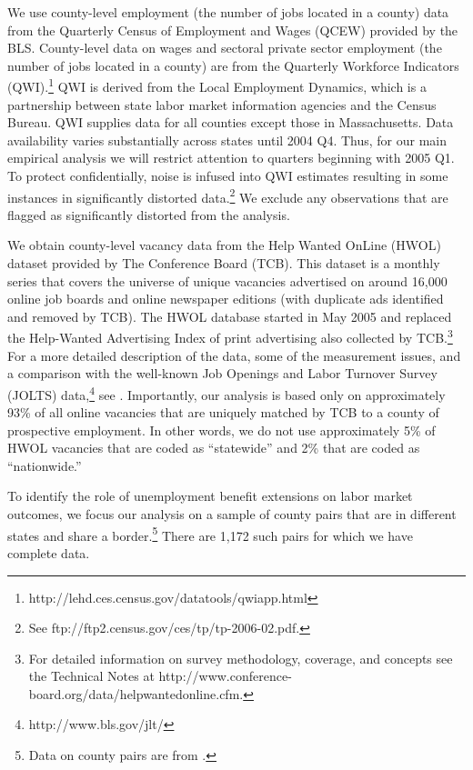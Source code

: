\documentclass[12pt]{article}
\newcommand{\1}{\mathbf{1}}
\begin{document}
We use county-level employment (the number of jobs located in a county) data from the Quarterly Census of Employment and Wages (QCEW) provided by the BLS.
County-level data on wages and sectoral private sector employment (the number of jobs located in a county) are from the Quarterly Workforce Indicators (QWI).\footnote{http://lehd.ces.census.gov/datatools/qwiapp.html} QWI is derived from the Local Employment Dynamics, which is a partnership between state labor market information agencies and the Census Bureau. QWI supplies data for all counties except those in Massachusetts. Data availability varies substantially across states until 2004 Q4. Thus, for our main empirical analysis we will restrict attention to quarters beginning with 2005 Q1. To protect confidentially, noise is infused into QWI estimates resulting in some instances in significantly distorted data.\footnote{See ftp://ftp2.census.gov/ces/tp/tp-2006-02.pdf.} We exclude any observations that are flagged as significantly distorted from the analysis.


We obtain county-level vacancy data from the Help Wanted OnLine (HWOL) dataset provided by The Conference Board (TCB). This dataset is a monthly series that covers the universe of unique vacancies advertised on around 16,000 online job boards and online newspaper editions (with duplicate ads identified and removed by TCB). The HWOL database started in May 2005 and replaced the Help-Wanted Advertising Index of print advertising also collected by TCB.\footnote{For detailed information on survey methodology, coverage, and concepts see the Technical Notes at http://www.conference-board.org/data/helpwantedonline.cfm.} For a more detailed description of the data, some of the measurement issues, and a comparison with the well-known Job Openings and Labor Turnover Survey (JOLTS) data,\footnote{http://www.bls.gov/jlt/} see \citet{sahin+etal:2012}. Importantly, our analysis is based only on approximately 93\% of all online vacancies that are uniquely matched by TCB to a county of prospective employment. In other words, we do not use approximately 5\% of HWOL vacancies that are coded as ``statewide'' and 2\% that are coded as ``nationwide.''



To identify the role of unemployment benefit extensions on labor market outcomes, we focus our analysis on a sample of county pairs that are in different states and share a border.\footnote{Data on county pairs are from \citet{dube+etal:10}.} There are 1,172 such pairs for which we have complete data.
\end{document}
